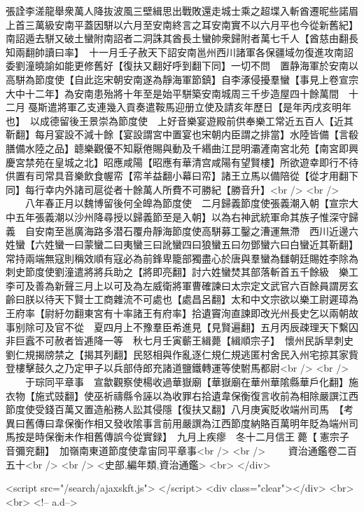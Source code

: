 張詮李溠龍舉衆萬人降抜波風三壁緝思出戰敗還走城士乘之超堞入斬酋遷昵些諾眉上首三萬級安南平蓋因駢以六月至安南終言之耳安南實不以六月平也今從新舊紀】南詔遁去駢又破土蠻附南詔者二洞誅其酋長土蠻帥衆歸附者萬七千人【酋慈由翻長知兩翻帥讀曰率】　十一月壬子赦天下詔安南邕州西川諸軍各保疆域勿復進攻南詔委劉潼曉諭如能更修舊好【復扶又翻好呼到翻下同】一切不問　置静海軍於安南以高駢為節度使【自此迄宋朝安南遂為靜海軍節鎮】自李涿侵擾羣蠻【事見上卷宣宗大中十二年】為安南患殆將十年至是始平駢築安南城周三千步造屋四十餘萬間　十二月戞斯遣將軍乙支連幾入貢奏遣鞍馬迎册立使及請亥年歷日【是年丙戌亥明年也】　以成德留後王景崇為節度使　上好音樂宴遊殿前供奉樂工常近五百人【近其靳翻】每月宴設不減十餘【宴設謂宮中置宴也宋朝内臣謂之排當】水陸皆備【言殽膳備水陸之品】聼樂觀優不知厭倦賜與動及千緡曲江昆明灞滻南宮北苑【南宮即興慶宮禁苑在皇城之北】昭應咸陽【昭應有華清宫咸陽有望賢樓】所欲遊幸即行不待供置有司常具音樂飲食幄帟【帟羊益翻小幕曰帟】諸王立馬以備陪從【從才用翻下同】每行幸内外諸司扈從者十餘萬人所費不可勝紀【勝音升】<br />
<br />
　　八年春正月以魏博留後何全皥為節度使　二月歸義節度使張義潮入朝【宣宗大中五年張義潮以沙州降尋授以歸義節至是入朝】以為右神武統軍命其族子惟深守歸義　自安南至邕廣海路多潜石覆舟靜海節度使高駢募工鑿之漕運無滯　西川近邊六姓蠻【六姓蠻一曰蒙蠻二曰夷蠻三曰訛蠻四曰狼蠻五曰勿鄧蠻六曰白蠻近其靳翻】常持兩端無寇則稱效順有寇必為前鋒卑籠部獨盡心於唐與羣蠻為讎朝廷賜姓李除為刺史節度使劉潼遣將將兵助之【將即亮翻】討六姓蠻焚其部落斬首五千餘級　樂工李可及善為新聲三月上以可及為左威衛將軍曹確諫曰太宗定文武官六百餘員謂房玄齡曰朕以待天下賢士工商雜流不可處也【處昌呂翻】太和中文宗欲以樂工尉遲璋為王府率【尉紆勿翻東宮有十率諸王有府率】拾遺竇洵直諫即改光州長史乞以兩朝故事别除可及官不從　夏四月上不豫羣臣希進見【見賢遍翻】五月丙辰疎理天下繫囚非巨蠧不可赦者皆逓降一等　秋七月壬寅蘄王緝薨【緝順宗子】　懷州民訴旱刺史劉仁規揭牓禁之【揭其列翻】民怒相與作亂逐仁規仁規逃匿村舍民入州宅掠其家貲登樓擊鼓久之乃定甲子以兵部侍郎充諸道鹽鐵轉運等使駙馬都尉<br />
<br />
　　于琮同平章事　宣歙觀察使楊收過華嶽廟【華嶽廟在華州華隂縣華戶化翻】施衣物【施式豉翻】使巫祈禱縣令誣以為收罪右拾遺韋保衡復言收前為相除嚴譔江西節度使受錢百萬又置造船務人訟其侵隱【復扶又翻】八月庚寅貶收端州司馬　【考異曰舊傳曰韋保衡作相又發收隂事言前用嚴譔為江西節度納賂百萬明年貶為端州司馬按是時保衡未作相舊傳誤今從實録】　九月上疾瘳　冬十二月信王薨【憲宗子音彌兖翻】　加嶺南東道節度使韋宙同平章事<br />
<br />
　　資治通鑑卷二百五十<br />
<br />
<史部,編年類,資治通鑑>  <br>
   </div> 

<script src="/search/ajaxskft.js"> </script>
 <div class="clear"></div>
<br>
<br>
 <!-- a.d-->

